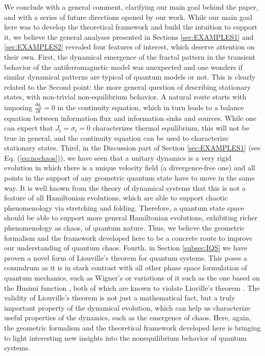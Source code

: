 \documentclass[draft,nofootinbib,pre,twocolumn,showpacs,showkeys,preprintnumbers,floatfix]{revtex4-1}
\newcommand{\1}{\mathbbm{1}}
\begin{document}
We conclude with a general comment, clarifying our main goal behind the paper, and with a series of future directions
opened by our work. While our main goal here was to develop the theoretical framework and build the intuition to 
support it, we believe the general analyses presented in Sections \ref{sec:EXAMPLES1} and \ref{sec:EXAMPLES2} 
revealed four features of interest, which deserve attention on their own. First, the dynamical emergence of the 
fractal pattern in the transient behavior of the antiferromagnetic model was unexpected and one wonders
if similar dynamical patterns are typical of quantum models or not. This is clearly related to the Second point: 
the more general question of describing stationary states, with non-trivial non-equilibrium behavior.
A natural route starts with imposing $\frac{\partial q_t}{\partial t} = 0$ in the continuity equation, which in turn 
leads to a balance equation between information flux and information sinks and sources. While one
can expect that $J_t=\sigma_t=0$ characterizes thermal equilibrium, this will not be true in general, and the
continuity equation can be used to characterize stationary states. Third, in the Discussion part of Section \ref{sec:EXAMPLES1} (see 
Eq. (\ref{eq:nochaos})), we have seen that a unitary dynamics is a very rigid evolution in which there is a unique
velocity field (a divergence-free one) and all points in the support of any geometric quantum state have to 
move in the same way. It is well known from the theory of dynamical systems that this is not a feature of all
Hamiltonian evolutions, which are able to support chaotic phenomenology via stretching and folding. Therefore, 
a quantum state space should be able to support more general Hamiltonian evolutions, exhibiting richer phenomenology
as chaos, of quantum nature. Thus, we believe the geometric formalism and the framework developed here to 
be a concrete route to improve our understanding of quantum chaos. Fourth, in Section \ref{subsec:IQS} we have 
proven a novel form of Liouville's theorem for quantum systems. This poses a conundrum as it is in stark contrast with 
all other phase space formulation of quantum mechanics, such as Wigner's \cite{Wig32} or variations of it such as 
the one based on the Husimi function \cite{Hus40}, both of which are known to violate Lioville's theorem \cite{Oliva18}. 
The validity of Liouville's theorem is not just a mathematical fact, but a truly important property of the dynamical 
evolution, which can help us characterize useful properties of the dynamics, such as the emergence of chaos. 
Here, again, the geometric formalism and the theoretical framework developed here is bringing to light interesting
new insights into the nonequilibrium behavior of quantum systems. 
\end{document}
